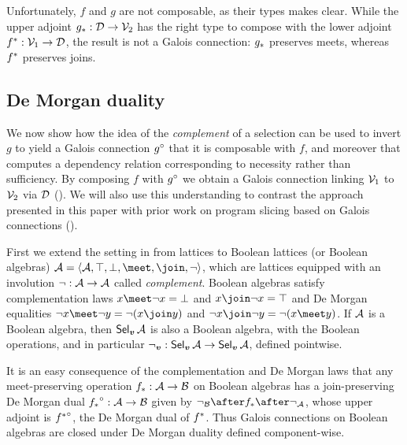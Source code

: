 \noindent Unfortunately, $f$ and $g$ are not composable, as their types makes clear. While the upper adjoint ${g}_*: \mathcal{D} \to \mathcal{V}_2$ has the right type to compose with the lower adjoint ${f}^*: \mathcal{V}_1 \to \mathcal{D}$, the result is not a Galois connection: ${g}_*$ preserves meets, whereas ${f}^*$ preserves joins.

\subsection{De Morgan duality}
\label{sec:toolkit:de-morgan-duality}

We now show how the idea of the \emph{complement} of a selection can be used to invert $g$ to yield a Galois connection ${g}^{\circ}$ that it is composable with $f$, and moreover that computes a dependency relation corresponding to necessity rather than sufficiency. By composing $f$ with ${g}^{\circ}$ we obtain a Galois connection linking $\mathcal{V}_1$ to $\mathcal{V}_2$ via $\mathcal{D}$ (). We will also use this understanding to contrast the approach presented in this paper with prior work on program slicing based on Galois connections ().

First we extend the setting in  from lattices to Boolean lattices (or Boolean algebras) $\Ann{A}= \BoolLattice{\Ann{A}}{\top}{\bot}{\meet}{\join}{\neg}$, which are lattices equipped with an involution $\neg: \mathcal{A} \to \mathcal{A}$ called \emph{complement}. Boolean algebras satisfy complementation laws $x \meet \neg x = \bot$ and $x \join \neg x = \top$ and De Morgan equalities $\neg x \meet \neg y = \neg(x \join y)$ and $\neg x \join \neg y = \neg(x \meet y)$. If $\mathcal{A}$ is a Boolean algebra, then $\textup{\textsf{Sel}}_{\bm{v}}\,{\mathcal{A}}$ is also a Boolean algebra, with the Boolean operations, and in particular $\neg_{\bm{v}}: \textup{\textsf{Sel}}_{\bm{v}}\,{\mathcal{A}} \to \textup{\textsf{Sel}}_{\bm{v}}\,{\mathcal{A}}$, defined pointwise.



It is an easy consequence of the complementation and De Morgan laws that any meet-preserving operation ${f}_*: \mathcal{A} \to \mathcal{B}$ on Boolean algebras has a join-preserving De Morgan dual ${{f}_*}^{\circ}: \mathcal{A} \to \mathcal{B}$ given by $\neg_{\Ann{B}} \after \upperAdj{f} \after \neg_{\Ann{A}}$, whose upper adjoint is ${{f}^*}^{\circ}$, the De Morgan dual of ${f}^*$. Thus Galois connections on Boolean algebras are closed under De Morgan duality defined component-wise.


